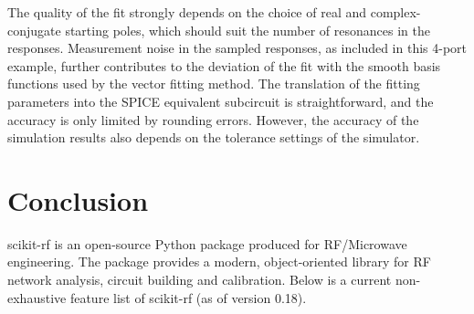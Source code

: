 \documentclass[10pt, letterpaper]{scrartcl}
\newcommand{\skrf}{{s}cikit-rf\xspace}
\begin{document}
The quality of the fit strongly depends on the choice of real and complex-conjugate starting poles, which should suit the number of resonances in the responses. Measurement noise in the sampled responses, as included in this 4-port example, further contributes to the deviation of the fit with the smooth basis functions used by the vector fitting method. The translation of the fitting parameters into the SPICE equivalent subcircuit is straightforward, and the accuracy is only limited by rounding errors. However, the accuracy of the simulation results also depends on the tolerance settings of the simulator.

\section{Conclusion}
\skrf{} is an open-source Python package produced for RF/Microwave engineering. The package provides a modern, object-oriented library for RF network analysis, circuit building and calibration. Below is a current non-exhaustive feature list of \skrf{} (as of version 0.18).
\end{document}
